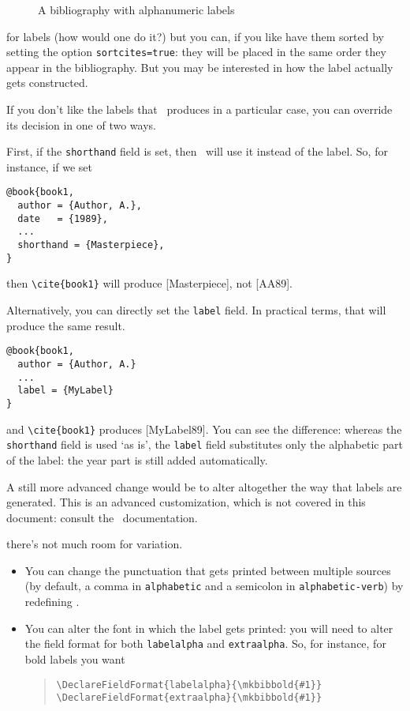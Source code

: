 \begin{figure}
\caption{A bibliography with alphanumeric
  labels\label{example:bibliography:alphabetic}}
\end{figure}

 for labels (how
would one do it?) but you can, if you like have them sorted by setting
the option \verb|sortcites=true|: they will be placed in the same
order they appear in the bibliography. But you may be interested in
how the label actually gets constructed.

If you don't like the labels that \biblatex\ produces in a particular
case, you can override its decision in one of two ways.

First, if the \verb|shorthand| field is set, then \biblatex\ will use
it instead of the label. So, for instance, if we set
\begin{verbatim}
@book{book1,
  author = {Author, A.},
  date   = {1989},
  ...
  shorthand = {Masterpiece},
}
\end{verbatim}
then \verb|\cite{book1}| will produce [Masterpiece], not [AA89].

Alternatively, you can directly set the \verb|label| field. In
practical terms, that will produce the same result.
\begin{verbatim}
@book{book1,
  author = {Author, A.} 
  ...
  label = {MyLabel}
}
\end{verbatim}
and \verb|\cite{book1}| produces [MyLabel89]. You can see the difference:
whereas the \verb|shorthand| field is used `as is', the \verb|label|
field substitutes only the alphabetic part of the label: the year part
is still added automatically.

A still more advanced change would be to alter altogether the way that
labels are generated. This is an advanced customization, which is not
covered in this document: consult the \biblatex\
documentation.

 there's not much room for
variation.
\begin{itemize}
\item You can change the punctuation that gets printed between
  multiple sources (by default, a comma in \verb|alphabetic| and a
  semicolon in \verb|alphabetic-verb|) by redefining
  .
\item You can alter the font in which the label gets printed: you will
  need to alter the field format for both \verb|labelalpha| and
  \verb|extraalpha|. So, for instance, for bold labels you want
\begin{quote}
\verb|\DeclareFieldFormat{labelalpha}{\mkbibbold{#1}}|\\
\verb|\DeclareFieldFormat{extraalpha}{\mkbibbold{#1}}|
\end{quote}
\end{itemize}

